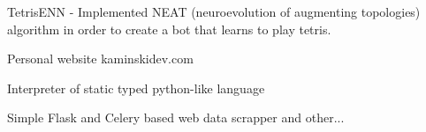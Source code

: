 \vspace{-3.7mm}
\begin{cventries}
{\fontsize{8pt}{1em}\bodyfont\scshape\color{graytext} \begin{cvitems}
\item  TetrisENN - Implemented NEAT (neuroevolution of augmenting topologies) algorithm in order to create a bot that learns to play tetris.
\item Personal website kaminskidev.com
\item Interpreter of static typed python-like language
\item Simple Flask and Celery based web data scrapper and other...
\end{cvitems}}
\end{cventries}

